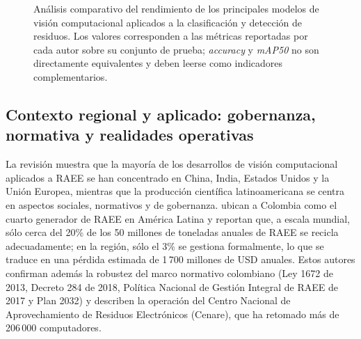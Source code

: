 \begin{figure}[H]
\centering
{}
\caption{Análisis comparativo del rendimiento de los principales modelos de visión computacional aplicados a la clasificación y detección de residuos. Los valores corresponden a las métricas reportadas por cada autor sobre su conjunto de prueba; \textit{accuracy} y \textit{mAP50} no son directamente equivalentes y deben leerse como indicadores complementarios.}
\label{fig:comparativo_modelos}
\end{figure}
\subsection{Contexto regional y aplicado: gobernanza, normativa y realidades operativas}

La revisión muestra que la mayoría de los desarrollos de visión computacional aplicados a RAEE se han concentrado en China, India, Estados Unidos y la Unión Europea, mientras que la producción científica latinoamericana se centra en aspectos sociales, normativos y de gobernanza. \cite{jesiddiazbastosImpactoResiduosAparatos2025} ubican a Colombia como el cuarto generador de RAEE en América Latina y reportan que, a escala mundial, sólo cerca del 20\% de los 50 millones de toneladas anuales de RAEE se recicla adecuadamente; en la región, sólo el 3\% se gestiona formalmente, lo que se traduce en una pérdida estimada de 1\,700 millones de USD anuales. Estos autores confirman además la robustez del marco normativo colombiano (Ley 1672 de 2013, Decreto 284 de 2018, Política Nacional de Gestión Integral de RAEE de 2017 y Plan 2032) y describen la operación del Centro Nacional de Aprovechamiento de Residuos Electrónicos (Cenare), que ha retomado más de 206\,000 computadores.\\

